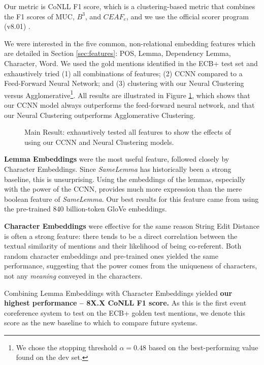 \documentclass[11pt,a4paper]{article}
\begin{document}
Our metric is CoNLL F1 score, which is a clustering-based metric that combines the F1 scores of MUC, $B^{3}$, and $CEAF_{e}$, and we use the official scorer program (v8.01) \cite{Pradhan+etal:14a}.


We were interested in the five common, non-relational embedding features which are detailed in Section \ref{sec:features}: POS, Lemma, Dependency Lemma, Character, Word.  We used the gold mentions identified in the ECB+ test set and exhaustively tried (1) all combinations of features; (2) CCNN compared to a Feed-Forward Neural Network; and (3) clustering with our Neural Clustering versus Agglomerative\footnote{We chose the stopping threshold $\alpha=0.48$ based on the best-performing value found on the dev set.}.  All results are illustrated in Figure \ref{fig:allfeatures}, which shows that our CCNN model always outperforms the feed-forward neural network, and that our Neural Clustering outperforms Agglomerative Clustering.

\begin{figure}
\label{fig:allfeatures}
\caption{Main Result: exhaustively tested all features to show the effects of using our CCNN and Neural Clustering models.}
\end{figure}

\textbf{Lemma Embeddings} were the most useful feature, followed closely by Character Embeddings.  Since \textit{SameLemma} has historically been a strong baseline, this is unsurprising.  Using the embeddings of the lemmas, especially with the power of the CCNN, provides much more expression than the mere boolean feature of \textit{SameLemma}.  Our best results for this feature came from using the pre-trained 840 billion-token GloVe embeddings.

\textbf{Character Embeddings} were effective for the same reason String Edit Distance is often a strong feature: there tends to be a direct correlation between the textual similarity of mentions and their likelihood of being co-referent. Both random character embeddings and pre-trained ones yielded the same performance, suggesting that the power comes from the uniqueness of characters, not any \textit{meaning} conveyed in the characters.

Combining Lemma Embeddings with Character Embeddings yielded \textbf{our highest performance -- 8X.X CoNLL F1 score.}  As this is the first event coreference system to test on the ECB+ golden test mentions, we denote this score as the new baseline to which to compare future systems.
\end{document}
